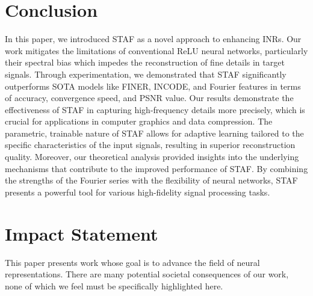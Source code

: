 \vspace{-0.75em}
\section{Conclusion}
\vspace{-0.5em}
In this paper, we introduced STAF as a novel approach to enhancing INRs. Our work mitigates the limitations of conventional ReLU neural networks, particularly their spectral bias which impedes the reconstruction of fine details in target signals. Through experimentation, we demonstrated that STAF significantly outperforms SOTA models like FINER, INCODE, and Fourier features in terms of accuracy, convergence speed, and PSNR value. Our results demonstrate the effectiveness of STAF in capturing high-frequency details more precisely, which is crucial for applications in computer graphics and data compression. The parametric, trainable nature of STAF allows for adaptive learning tailored to the specific characteristics of the input signals, resulting in superior reconstruction quality. Moreover, our theoretical analysis provided insights into the underlying mechanisms that contribute to the improved performance of STAF. By combining the strengths of the Fourier series with the flexibility of neural networks, STAF presents a powerful tool for various high-fidelity signal processing tasks.
\vspace{-0.75em}
\section*{Impact Statement}
\vspace{-0.5em}
This paper presents work whose goal is to advance the field of neural representations. There are many potential societal consequences of our work, none of which we feel must be specifically highlighted here.